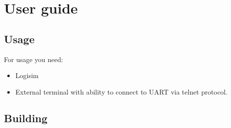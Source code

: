 \chapter*{User guide}

\section*{Usage}

For usage you need:

\begin{itemize}
	\item Logisim
	\item External terminal with ability to connect to UART via telnet protocol.
\end{itemize}

\section*{Building}
